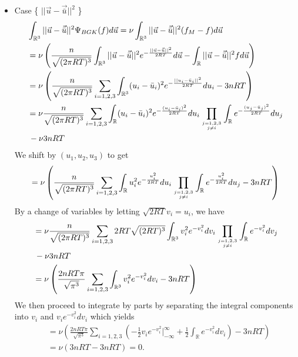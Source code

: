 \begin{itemize}
\item Case \{ $||\vec{u} - \vec{\bar{u}}||^2$ \}
%
\begin{align*}
&\int_{\mathbb{R}^3} ||\vec{u} - \vec{\bar{u}}||^2 \Psi_{BGK} (f) d\vec{u} = \nu \int_{\mathbb{R}^3} ||\vec{u} - \vec{\bar{u}}||^2 (f_M - f) d\vec{u}\\
&= \nu \left( \frac{n}{\sqrt{(2 \pi R T)^3}} \int_{\mathbb{R}^3} ||\vec{u} - \vec{\bar{u}}||^2 e^{-\frac{||\vec{u} - \vec{\bar{u}}||^2}{2 R T}} d\vec{u} - \int_{\mathbb{R}} ||\vec{u} - \vec{\bar{u}}||^2 f d\vec{u} \right)\nonumber \\
&= \nu \left( \frac{n}{\sqrt{(2 \pi R T)^3}} \sum_{i=1,2,3} \int_{\mathbb{R}^3} (u_i - \bar{u}_i)^2 e^{-\frac{||u_i - \bar{u}_i||^2}{2 R T}} du_i - 3 n R T \right)\nonumber \\
&= \nu \frac{n}{\sqrt{(2 \pi R T)^3}} \sum_{i=1,2,3} \int_{\mathbb{R}} (u_i - \bar{u}_i)^2 e^{-\frac{(u_i - \bar{u}_i)^2}{2 R T}} du_i \prod_{j=1,2,3 \atop j \ne i} \int_{\mathbb{R}} e^{-\frac{(u_j - \bar{u}_j)^2}{2 R T}} du_j\\
& \, - \nu 3 n R T
\end{align*}
%
We shift by $(u_1,u_2,u_3)$ to get
%
\begin{align*}
= \nu \left( \frac{n}{\sqrt{(2 \pi R T)^3}} \sum_{i=1,2,3} \int_{\mathbb{R}} u_i^2 e^{-\frac{u_i^2}{2 R T}} du_i \prod_{j=1,2,3 \atop j \ne i} \int_{\mathbb{R}} e^{-\frac{u_i^2}{2 R T}} du_j  - 3 n R T \right)
\end{align*}
%
By a change of variables by letting $\sqrt{2 R T} v_i = u_i$, we have
%
\begin{align*}
&= \nu \frac{n}{\sqrt{(2 \pi R T)^3}} \sum_{i=1,2,3} 2 R T \sqrt{(2 R T)^3} \int_{\mathbb{R}^3} v_i^2 e^{-v_i^2} dv_i \prod_{j=1,2,3 \atop j \ne i} \int_{\mathbb{R}} e^{-v_i^2} dv_j\\
& \, - \nu 3 n R T\\
&= \nu \left( \frac{2 n R T \pi}{\sqrt{\pi^3}} \sum_{i=1,2,3} \int_{\mathbb{R}^3} v_i^2 e^{-v_i^2} dv_i - 3 n R T \right)\\
\end{align*}
%
We then proceed to integrate by parts by separating the integral components into $v_i$ and $v_i e^{-v_i^2} dv_i$ which yields
%
\begin{align}
&= \nu \left( \frac{2 n R T \pi}{\sqrt{\pi^3}} \sum_{i=1,2,3} \left(-\frac{1}{2} v_i e^{-v_i^2}|_{-\infty}^\infty + \frac{1}{2} \int_{\mathbb{R}} e^{-v_i^2} dv_i \right) - 3 n R T \right)\nonumber \\
&= \nu \left(3 n R T - 3 n R T \right) = 0.
\end{align}
\end{itemize}
